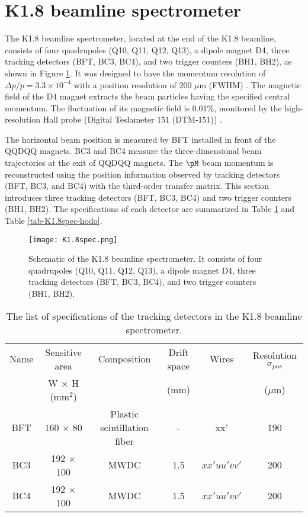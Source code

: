 \section{K1.8 beamline spectrometer}
\label{sec-k18beamspec}

The K1.8 beamline spectrometer, located at the end of the K1.8 beamline, consists of four quadrupoles (Q10, Q11, Q12, Q13), a dipole magnet D4, three tracking detectors (BFT, BC3, BC4), and two trigger counters (BH1, BH2), as shown in Figure \ref{fig-K1.8spec}. It was designed to have the momentum resolution of $\Delta p/p = 3.3\times10^{-4}$ with a position resolution of 200 $\mu$m (FWHM) \cite{K1.8}. The magnetic field of the D4 magnet extracts the beam particles having the specified central momentum. The fluctuation of its magnetic field is 0.01\%, monitored by the high-resolution Hall probe (Digital Teslameter 151 (DTM-151)) \cite{DTM-151}.

The horizontal beam position is measured by BFT installed in front of the QQDQQ magnets. BC3 and BC4 measure the three-dimensional beam trajectories at the exit of QQDQQ magnets. The $\pM$ beam momentum is reconstructed using the position information observed by tracking detectors (BFT, BC3, and BC4) with the third-order transfer matrix. This section introduces three tracking detectors (BFT, BC3, BC4) and two trigger counters (BH1, BH2). The specifications of each detector are summarized in Table \ref{tab-K1.8spec-tracker} and Table \ref{tab-K1.8spec-hodo}.

\begin{figure}[!h]
 \begin{center}
   \texttt{[image: K1.8spec.png]}
   \caption{Schematic of the K1.8 beamline spectrometer. It consists of four quadrupoles (Q10, Q11, Q12, Q13), a dipole magnet D4, three tracking detectors (BFT, BC3, BC4), and two trigger counters (BH1, BH2).}
   \label{fig-K1.8spec}
 \end{center}
\end{figure}

\begin{table}[h]
  \begin{center}
    \caption{The list of specifications of the tracking detectors in the K1.8 beamline spectrometer.}
    \begin{tabular}{cccccc} \hline \hline
      Name & Sensitive area & Composition & Drift space & Wires & Resolution $\sigma_{pos}$\\
       & W $\times$ H (mm$^2$) & & (mm) & & ($\mu$m) \\ \hline
      BFT & 160 $\times$ 80 & Plastic scintillation fiber & - & xx' & 190 \\
      BC3 & 192 $\times$ 100 & MWDC & 1.5 & $xx'uu'vv'$ & 200  \\ 
      BC4 & 192 $\times$ 100 & MWDC & 1.5 & $xx'uu'vv'$ & 200 \\ 
\hline\hline
   \end{tabular}
   \label{tab-K1.8spec-tracker}
   \end{center}
\end{table}

